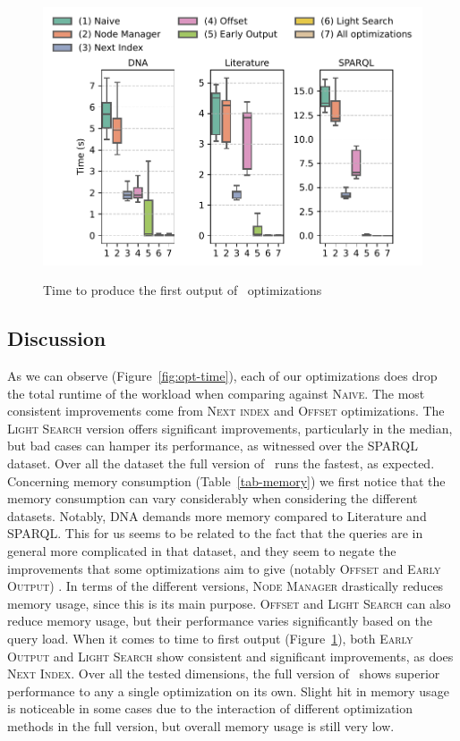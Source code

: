 \begin{figure}[t]
	\centering
	\includegraphics[width=.8\textwidth]{figures/versions-fot.pdf}
	\label{fig:opt-firstOT}
	\caption{Time to produce the first output of \rematch\ optimizations}
	\label{fig-optimizations}
\end{figure}



\subsection{Discussion}
As we can observe (Figure~\ref{fig:opt-time}), each of our optimizations does
drop the total runtime of the workload when comparing against \textsc{Naive}.
The most consistent improvements come from \textsc{Next index} and
\textsc{Offset} optimizations. The \textsc{Light Search} version offers
significant improvements, particularly in the median, but bad cases can hamper
its performance, as witnessed over the \textsf{SPARQL} dataset. Over all the
dataset the full version of \rematch\ runs the fastest, as expected. Concerning
memory consumption (Table~\ref{tab-memory}) we first notice that the memory
consumption can vary considerably when considering the different datasets.
Notably, \textsf{DNA} demands more memory compared to \textsf{Literature} and
\textsf{SPARQL}. This for us seems to be related to the fact that the queries
are in general more complicated in that dataset, and they seem to negate the
improvements that some optimizations aim to give (notably \textsc{Offset} and
\textsc{Early Output}) . In terms of the different versions, \textsc{Node
Manager} drastically reduces memory usage, since this is its main purpose.
\textsc{Offset} and \textsc{Light Search} can also reduce memory usage, but
their performance varies significantly based on the query load. When it comes to
time to first output (Figure~\ref{fig-optimizations}), both \textsc{Early
Output} and \textsc{Light Search} show consistent and significant improvements,
as does \textsc{Next Index}. Over all the tested dimensions, the full version of
\rematch\ shows superior performance to any a single optimization on its own.
Slight hit in memory usage is noticeable in some cases due to the interaction of
different optimization methods in the full version, but overall memory usage is
still very low.


